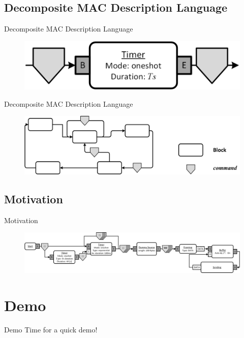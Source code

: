 \documentclass{beamer}
\begin{document}
\subsection{Decomposite MAC Description Language}
\begin{frame}{Decomposite MAC Description Language}
	\begin{figure}
 		\includegraphics[width=\linewidth]{simple_timer.png}
 		\label{fig:timer}
	\end{figure}
\end{frame}

\begin{frame}{Decomposite MAC Description Language}
	\begin{figure}
 		\includegraphics[width=\linewidth]{graph.png}
 		\label{fig:graph}
	\end{figure}
\end{frame}

\subsection{Motivation}
\begin{frame}{Motivation}
	\begin{figure}
 		\includegraphics[width=\linewidth]{pure_aloha.png}
 		\label{fig:aloha}
	\end{figure}
\end{frame}

\section{Demo}
\begin{frame}{Demo}
Time for a quick demo!
\end{frame}
\end{document}
